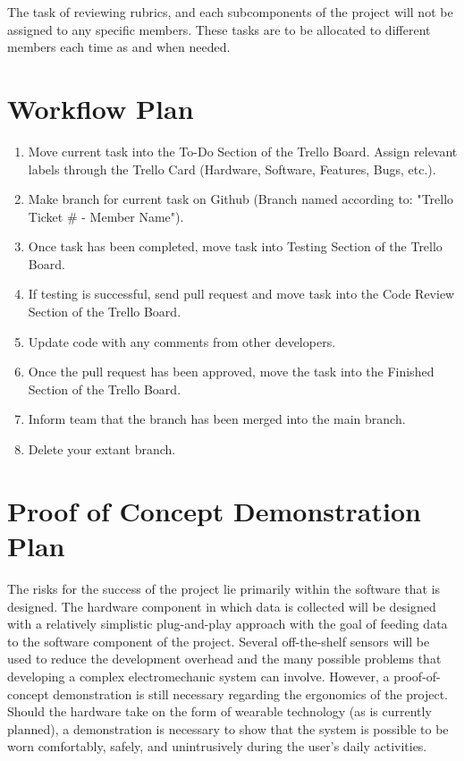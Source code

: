 \documentclass[12pt]{article}
\begin{document}
The task of reviewing rubrics, and each subcomponents of the project will not be assigned to any specific members. These tasks are to be allocated to different members each time as and when needed.\\

\pagebreak

\section{Workflow Plan}
\begin{enumerate}
\item Move current task into the To-Do Section of the Trello Board. Assign relevant labels through the Trello Card (Hardware, Software, Features, Bugs, etc.).
\item Make branch for current task on Github (Branch named according to: "Trello Ticket \# - Member Name").
\item Once task has been completed, move task into Testing Section of the Trello Board.
\item If testing is successful, send pull request and move task into the Code Review Section of the Trello Board.
\item Update code with any comments from other developers.
\item Once the pull request has been approved, move the task into the Finished Section of the Trello Board.
\item Inform team that the branch has been merged into the main branch.
\item Delete your extant branch.
\end{enumerate}



\section{Proof of Concept Demonstration Plan}

The risks for the success of the project lie primarily within the software that is designed. The hardware component in which data is collected will be designed with a relatively simplistic plug-and-play approach with the goal of feeding data to the software component of the project. Several off-the-shelf sensors will be used to reduce the development overhead and the many possible problems that developing a complex electromechanic system can involve. However, a proof-of-concept demonstration is still necessary regarding the ergonomics of the project. Should the hardware take on the form of wearable technology (as is currently planned), a demonstration is necessary to show that the system is possible to be worn comfortably, safely, and unintrusively during the user's daily activities.\\
\end{document}
